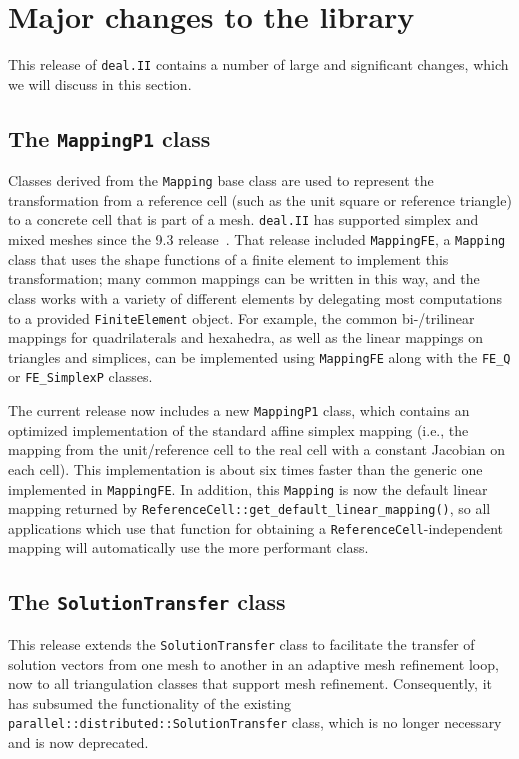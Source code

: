 \documentclass{ansarticle-preprint}
\newcommand{\specialword}[1]{\texttt{#1}}
\newcommand{\dealii}{{\specialword{deal.II}}\xspace}
\begin{document}
\section{Major changes to the library}
\label{sec:major}

This release of \dealii contains a number of large and significant changes,
which we will discuss in this section.


\subsection{The \texttt{MappingP1} class}

Classes derived from the \texttt{Mapping} base class are used to
represent the transformation from a reference cell (such as the unit
square or reference triangle) to a concrete cell that is part of a mesh.
\dealii has supported simplex and mixed meshes since the 9.3
release~\cite{dealii93}. That release included \texttt{MappingFE}, a
\texttt{Mapping} class that uses the shape functions of a finite
element to implement this transformation; many common mappings can be
written in this way, and the class works with a variety of different elements by
delegating most computations to a provided \texttt{FiniteElement}
object. For example, the common bi-/trilinear mappings for quadrilaterals and
hexahedra, as well as the linear mappings on triangles and simplices,
can be implemented using \texttt{MappingFE} along with the
\texttt{FE\_Q} or \texttt{FE\_SimplexP} classes.

The current
release now includes a new \texttt{MappingP1} class, which contains an optimized
implementation of the standard affine simplex mapping (i.e., the mapping from
the unit/reference cell to the real cell with a constant Jacobian on each cell). This
implementation is about six times faster than the generic one implemented in
\texttt{MappingFE}. In addition, this \texttt{Mapping} is now the default linear
mapping returned by \texttt{ReferenceCell::get\_default\_linear\_mapping()}, so
all applications which use that function for obtaining a
\texttt{ReferenceCell}-independent mapping will automatically use the more
performant class.

\subsection{The \texttt{SolutionTransfer} class}
This release extends the \texttt{SolutionTransfer} class to facilitate
the transfer of solution vectors from one mesh to another in an
adaptive mesh refinement loop, now to
all triangulation classes that support mesh refinement.
Consequently, it has subsumed the functionality of the existing
\texttt{parallel::distributed::SolutionTransfer} class, which is no
longer necessary and is now deprecated.
\end{document}
